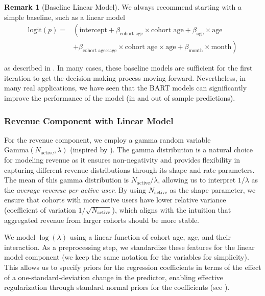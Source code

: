 \documentclass[11pt]{amsart}
\theoremstyle{definition}
\newtheorem{remark}{Remark}
\begin{document}
\begin{remark}[Baseline Linear Model]
    We always recommend starting with a simple baseline, such as a linear model
    \begin{align*}
        \text{logit}(p)  = & \left(\text{intercept} + \beta_{\text{cohort age}} \times \text{cohort age} + \beta_{\text{age}} \times \text{age} \right.                        \\
                           & \left. + \beta_{\text{cohort age} \times \text{age}} \times \text{cohort age} \times \text{age} + \beta_{\text{month}} \times \text{month}\right)
    \end{align*}

    as described in \cite{orduz_revenue_retention}. In many cases, these baseline models are sufficient for the first
    iteration to get the decision-making process moving forward. Nevertheless, in many real applications, we have seen that
    the BART models can significantly improve the performance of the model (in and out of sample predictions).
\end{remark}

\subsubsection{Revenue Component with Linear Model}

For the revenue component, we employ a gamma random variable $\text{Gamma}(N_{\text{active}}, \lambda)$ (inspired by
\cite{stucchio2015bayesian}). The gamma distribution is a natural choice for modeling revenue as it ensures non-negativity
and provides flexibility in capturing different revenue distributions through its shape and rate parameters. The mean of
this gamma distribution is $N_{\text{active}} / \lambda$, allowing us to interpret $1 / \lambda$ as the {\em average
revenue per active user}. By using $N_{\text{active}}$ as the shape parameter, we ensure that cohorts with more active
users have lower relative variance (coefficient of variation $1/\sqrt{N_{\text{active}}}$), which aligns with the intuition
that aggregated revenue from larger cohorts should be more stable. 

We model $\log(\lambda)$ using a linear function of cohort age, age, and their interaction. As a preprocessing step, we 
standardize these features for the linear model component (we keep the same notation for the variables for simplicity). 
This allows us to specify priors for the regression coefficients in terms of the effect of a one-standard-deviation change 
in the predictor, enabling effective regularization through standard normal priors for the coefficients (see \cite{orduz_retention_bart}).
\end{document}
